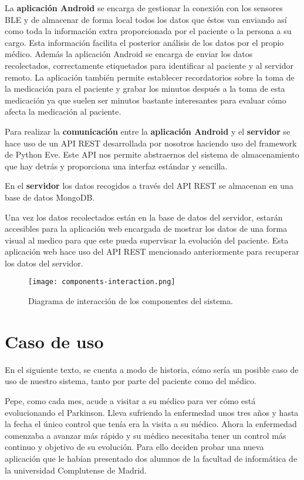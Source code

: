 \documentclass[11pt,spanish]{article}
\begin{document}
La \textbf{aplicación Android} se encarga de gestionar la conexión con los sensores BLE y de almacenar de forma local todos los datos que éstos van enviando así como toda la información extra proporcionada por el paciente o la persona a su cargo. Esta información facilita el posterior análisis de los datos por el propio médico. Además la aplicación Android se encarga de enviar los datos recolectados, correctamente etiquetados para identificar al paciente y al servidor remoto. La aplicación también permite establecer recordatorios sobre la toma de la medicación para el paciente y grabar los minutos después a la toma de esta medicación ya que suelen ser minutos bastante interesantes para evaluar cómo afecta la medicación al paciente.
\newline

Para realizar la \textbf{comunicación} entre la \textbf{aplicación Android} y el \textbf{servidor} se hace uso de un API REST desarrollada por nosotros haciendo uso del framework de Python Eve. Este API nos permite abstraernos del sistema de almacenamiento que hay detrás y proporciona una interfaz estándar y sencilla.
\newline

En el \textbf{servidor} los datos recogidos a través del API REST se almacenan en una base de datos MongoDB.
\newline

Una vez los datos recolectados están en la base de datos del servidor, estarán accesibles para la aplicación web encargada de mostrar los datos de una forma visual al medico para que este pueda supervisar la evolución del paciente. Esta aplicación web hace uso del API REST mencionado anteriormente para recuperar los datos del servidor.
\newline

\begin{figure}[H]
  \centering
  \texttt{[image: components-interaction.png]}
  \caption{Diagrama de interacción de los componentes del sistema.}
\end{figure}
\newpage

\section{Caso de uso}
En el siguiente texto, se cuenta a modo de historia, cómo sería un posible caso de uso de nuestro sistema, tanto por parte del paciente como del médico.
\newline

Pepe, como cada mes, acude a visitar a su médico para ver cómo está evolucionando el Parkinson. Lleva sufriendo la enfermedad unos tres años y hasta la fecha el único control que tenía era la visita a su médico. Ahora la enfermedad comenzaba a avanzar más rápido y su médico necesitaba tener un control más continuo y objetivo de su evolución. Para ello deciden probar una nueva aplicación que le habían presentado dos alumnos de la facultad de informática de la universidad Complutense de Madrid.
\newline
\end{document}
